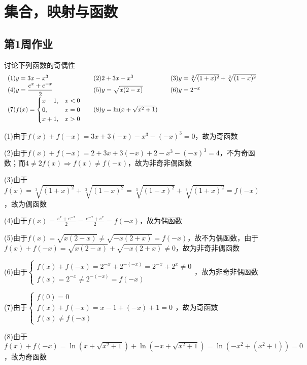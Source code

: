 \chapter{集合，映射与函数}
\newpage
\section{第1周作业}
\begin{example}{讨论下列函数的奇偶性}{}\vspace{-10pt}
\[\begin{array}{l@{\quad\quad}l@{\quad\quad}l}
    (1)y=3x-x^3&(2)2+3x-x^3&(3)y=\sqrt[3]{(1+x)^2}+\sqrt[3]{(1-x)^2}\\
    (4)y=\dfrac{e^x+e^{-x}}{2}&(5)y=\sqrt{x(2-x)}&(6)y=2^{-x}\\
    (7)f(x)=\begin{cases}x-1,&x<0\\0,&x=0\\x+1,&x>0\end{cases}&(8)y=\ln (x+\sqrt{x^2+1})
\end{array}\]\end{example}
\begin{solution}
    (1)由于$f(x)+f(-x)=3x+3(-x)-x^3-(-x)^3=0$，故为奇函数

    (2)由于$f(x)+f(-x)=2+3x+3(-x)+2-x^3-(-x)^3=4$，不为奇函数；而$4\ne 2f(x)\Rightarrow f(x)\ne f(-x)$，故为非奇非偶函数

    (3)由于$f(x)=\sqrt[3]{(1+x)^2}+\sqrt[3]{(1-x)^2}=\sqrt[3]{(1-x)^2}+\sqrt[3]{(1+x)^2}=f(-x)$，故为偶函数

    (4)由于$f(x)=\frac{e^x+e^{-x}}{2}=\frac{e^{-x}+e^x}{2}=f(-x)$，故为偶函数

    (5)由于$f(x)=\sqrt{x(2-x)}\neq\sqrt{-x(2+x)}=f(-x)$，故不为偶函数，由于$f(x)+f(-x)=\sqrt{x(2-x)}+\sqrt{-x(2+x)}\neq 0$，故为非奇非偶函数

    (6)由于$\begin{cases}f(x)+f(-x)=2^{-x}+2^{-(-x)}=2^{-x}+2^{x}\ne 0\\f(x)=2^{-x}\neq2^{-(-x)}=f(-x)\end{cases}$，故为非奇非偶函数

    (7)由于$\begin{cases}f(0)=0\\f(x)+f(-x)=x-1+(-x)+1=0\\f(x)\neq f(-x)\end{cases}$，故为奇函数

    (8)由于$f(x)+f(-x)=\ln (x+\sqrt{x^2+1})+\ln (-x+\sqrt{x^2+1})=\ln (-x^2+(x^2+1))=0$，故为奇函数
\end{solution}
